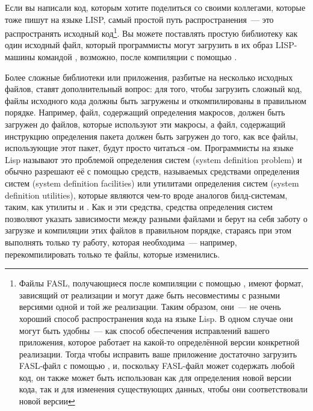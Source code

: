 Если вы написали код, которым хотите поделиться со своими коллегами, которые тоже пишут на
языке LISP, самый простой путь распространения~--- это распространять исходный
код\footnote{Файлы FASL, получающиеся после компиляции с помощью ,
  имеют формат, зависящий от реализации и могут даже быть несовместимы с разными версиями
  одной и той же реализации. Таким образом, они~--- не очень хороший способ распространения
  кода на языке Lisp. В одном случае они могут быть удобны~--- как способ обеспечения
  исправлений вашего приложения, которое работает на какой-то определённой версии
  конкретной реализации. Тогда чтобы исправить ваше приложение достаточно загрузить
  FASL-файл с помощью , и, поскольку FASL-файл может содержать любой код, он
  также может быть использован как для определения новой версии кода, так и для изменения
  существующих данных, чтобы они соответствовали новой версии}. Вы можете поставлять
простую библиотеку как один исходный файл, который программисты могут загрузить в их образ
LISP-машины командой , возможно, после компиляции с помощью
.

Более сложные библиотеки или приложения, разбитые на несколько исходных файлов, ставят
дополнительный вопрос: для того, чтобы загрузить сложный код, файлы исходного кода должны
быть загружены и откомпилированы в правильном порядке. Например, файл, содержащий
определения макросов, должен быть загружен до файлов, которые используют эти макросы, а
файл, содержащий инструкцию определения пакета  должен быть загружен до
того, как все файлы, использующие этот пакет, будут просто читаться
-ом. Программисты на языке Lisp называют это проблемой определения систем
(system definition problem) и обычно разрешают её с помощью средств, называемых средствами
определения систем (system definition facilities) или утилитами определения систем (system
definition utilities), которые являются чем-то вроде аналогов билд-системам, таким, как
утилиты  и . Как и эти средства, средства определения систем
позволяют указать зависимости между разными файлами и берут на себя заботу о загрузке и
компиляции этих файлов в правильном порядке, стараясь при этом выполнять только ту работу,
которая необходима~--- например, перекомпилировать только те файлы, которые изменились.

